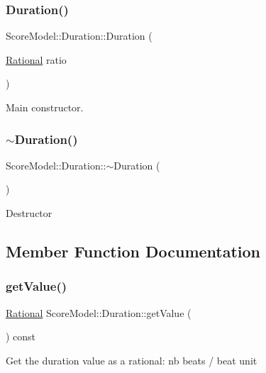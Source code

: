 \subsubsection{\texorpdfstring{Duration()}{Duration()}}
{\footnotesize\ttfamily Score\+Model\+::\+Duration\+::\+Duration (\begin{DoxyParamCaption}\item[{\mbox{\hyperlink{classRational}{Rational}}}]{ratio }\end{DoxyParamCaption})}

Main constructor. \mbox{\label{classScoreModel_1_1Duration_a3f30d745dfae4286f5fb9dfdf0542d64}} 
\subsubsection{\texorpdfstring{$\sim$Duration()}{~Duration()}}
{\footnotesize\ttfamily Score\+Model\+::\+Duration\+::$\sim$\+Duration (\begin{DoxyParamCaption}{ }\end{DoxyParamCaption})}

Destructor 

\subsection{Member Function Documentation}
\mbox{\label{classScoreModel_1_1Duration_a8fce14c5c61ab8575d9fbc77025fb1cd}} 
\subsubsection{\texorpdfstring{getValue()}{getValue()}}
{\footnotesize\ttfamily \mbox{\hyperlink{classRational}{Rational}} Score\+Model\+::\+Duration\+::get\+Value (\begin{DoxyParamCaption}{ }\end{DoxyParamCaption}) const\hspace{0.3cm}{\ttfamily [inline]}}

Get the duration value as a rational\+: nb beats / beat unit \mbox{\label{classScoreModel_1_1Duration_a43dc9acb53b931de80f75fd929d9fd4d}} 
